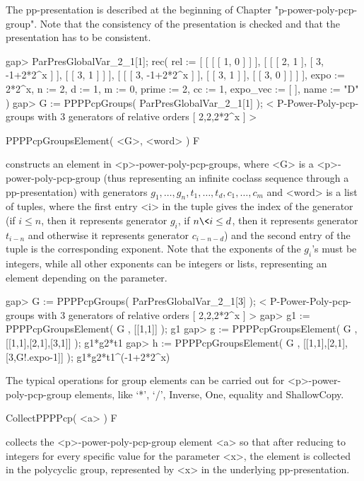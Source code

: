 The pp-presentation is described at the beginning of Chapter 
"p-power-poly-pcp-group". Note that the consistency of the presentation is 
checked and that the presentation has to be consistent.

\beginexample
gap> ParPresGlobalVar_2_1[1];
rec( 
  rel := [ [ [ [ 1, 0 ] ] ], [ [ [ 2, 1 ], [ 3, -1+2*2^x ] ], [ [ 3, 1 ] ] ], 
      [ [ [ 3, -1+2*2^x ] ], [ [ 3, 1 ] ], [ [ 3, 0 ] ] ] ], expo := 2*2^x, 
  n := 2, d := 1, m := 0, prime := 2, cc := 1, expo_vec := [  ], name := "D" )
gap> G := PPPPcpGroups( ParPresGlobalVar_2_1[1] );
< P-Power-Poly-pcp-groups with 3 generators of relative orders [ 2,2,2*2^x ] >
\endexample

\>PPPPcpGroupsElement( <G>, <word> ) F

constructs an element in <p>-power-poly-pcp-groups, where <G> is a 
<p>-power-poly-pcp-group (thus representing an infinite coclass sequence 
through a pp-presentation) with generators $g_1, \ldots, g_n, t_1, 
\ldots, t_d, c_1, \ldots, c_m$ and <word> is a list of tuples, where the first 
entry <i> in the tuple gives the index of the generator (if $i \le n$, then 
it represents generator $g_i$, if $n \< i \le d$, then it represents generator
$t_{i-n}$ and otherwise it represents generator $c_{i-n-d}$) and the second 
entry of the tuple is the corresponding exponent. Note that the exponents 
of the $g_i$'s must be integers, while all other exponents can be integers 
or lists, representing an element depending on the parameter.

\beginexample
gap> G := PPPPcpGroups( ParPresGlobalVar_2_1[3] );
< P-Power-Poly-pcp-groups with 3 generators of relative orders [ 2,2,2*2^x ] >
gap> g1 := PPPPcpGroupsElement( G , [[1,1]] );
g1
gap> g := PPPPcpGroupsElement( G , [[1,1],[2,1],[3,1]] );
g1*g2*t1
gap> h := PPPPcpGroupsElement( G , [[1,1],[2,1],[3,G!.expo-1]] );
g1*g2*t1^(-1+2*2^x)
\endexample


The typical operations for group elements can be carried out for 
<p>-power-poly-pcp-group elements, like `*', `/', Inverse, One, equality and 
ShallowCopy.

\>CollectPPPPcp( <a> ) F

collects the <p>-power-poly-pcp-group element <a> so that after reducing to
integers for every specific value for the parameter <x>, the element is 
collected in the polycyclic group, represented by <x> in the underlying 
pp-presentation. 

